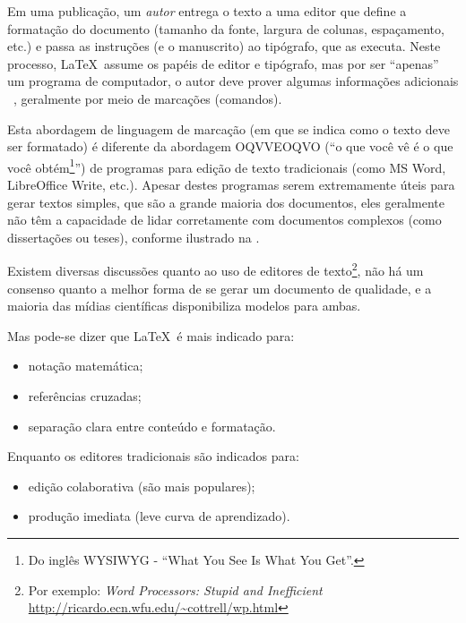 Em uma publicação, um \emph{autor} entrega o texto a uma editor que define a
formatação do documento (tamanho da fonte, largura de colunas, espaçamento, etc.)
e passa as instruções (e o manuscrito) ao tipógrafo, que as executa. Neste processo,
\LaTeX\ assume os papéis de editor e tipógrafo, mas por ser ``apenas'' um programa
de computador, o autor deve prover algumas informações adicionais ~\cite{Oetiker_1995_notsoshort},
geralmente por meio de marcações (comandos).

Esta abordagem de linguagem de marcação (em que se indica como o texto deve ser
formatado) é diferente da abordagem OQVVEOQVO (``o que você vê é o que você
obtém\footnote{Do inglês WYSIWYG - ``What You See Is What You Get''.}'') de programas
para edição de texto tradicionais (como MS Word, LibreOffice Write, etc.).
Apesar destes programas serem extremamente úteis para gerar textos simples, que
são a grande maioria dos documentos, eles geralmente não têm a capacidade de lidar
corretamente com documentos complexos (como dissertações ou teses), conforme ilustrado
na .%

%

Existem diversas discussões quanto ao uso de editores de texto\footnote{Por exemplo:
\emph{Word Processors: Stupid and Inefficient} \url{http://ricardo.ecn.wfu.edu/~cottrell/wp.html}},
não há um consenso quanto a melhor forma de se gerar um documento de qualidade,
e a maioria das mídias científicas disponibiliza modelos para ambas.

Mas pode-se dizer que \LaTeX\ é mais indicado para:
\begin{itemize}
	\item notação matemática;
	\item referências cruzadas;
	\item separação clara entre conteúdo e formatação.
\end{itemize}

Enquanto os editores tradicionais são indicados para:
\begin{itemize}
	\item edição colaborativa (são mais populares);
	\item produção imediata (leve curva de aprendizado).
\end{itemize}

